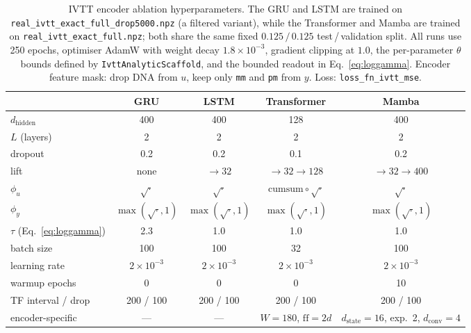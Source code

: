 \begin{table}[h]
\centering
\caption{IVTT encoder ablation hyperparameters. The GRU and LSTM are
trained on \texttt{real\_ivtt\_exact\_full\_drop5000.npz} (a filtered
variant), while the Transformer and Mamba are trained on
\texttt{real\_ivtt\_exact\_full.npz}; both share the same fixed
$0.125\,/\,0.125$ test\,/\,validation split. All runs use 250 epochs,
optimiser AdamW with weight decay $1.8\!\times\!10^{-3}$, gradient clipping
at $1.0$, the per-parameter $\theta$ bounds defined by
\texttt{IvttAnalyticScaffold}, and the bounded readout in
Eq.~\ref{eq:loggamma}. Encoder feature mask: drop DNA from $u$, keep only
\texttt{mm} and \texttt{pm} from $y$. Loss: \texttt{loss\_fn\_ivtt\_mse}.}
\label{tab:ivtt-hparams}
\small
\begin{tabular}{lcccc}
\hline
                        & GRU                  & LSTM                 & Transformer                                 & Mamba \\
\hline
$d_{\mathrm{hidden}}$   & 400                  & 400                  & 128                                         & 400 \\
$L$ (layers)            & 2                    & 2                    & 2                                           & 2 \\
dropout                 & 0.2                  & 0.2                  & 0.1                                         & 0.2 \\
lift                    & none                 & $\to\!32$            & $\to\!32\!\to\!128$                         & $\to\!32\!\to\!400$ \\
$\phi_u$                & $\sqrt{\cdot}$       & $\sqrt{\cdot}$       & $\mathrm{cumsum}\!\circ\!\sqrt{\cdot}$      & $\sqrt{\cdot}$ \\
$\phi_y$                & $\max(\sqrt{\cdot},1)$ & $\max(\sqrt{\cdot},1)$ & $\max(\sqrt{\cdot},1)$                  & $\max(\sqrt{\cdot},1)$ \\
$\tau$ (Eq.~\ref{eq:loggamma}) & 2.3           & 1.0                  & 1.0                                         & 1.0 \\
batch size              & 100                  & 100                  & 32                                          & 100 \\
learning rate           & $2\!\times\!10^{-3}$ & $2\!\times\!10^{-3}$ & $2\!\times\!10^{-3}$                        & $2\!\times\!10^{-3}$ \\
warmup epochs           & 0                    & 0                    & 0                                           & 10 \\
TF interval / drop      & 200 / 100            & 200 / 100            & 200 / 100                                   & 200 / 100 \\
encoder-specific        & ---                  & ---                  & $W\!=\!180$, $\mathrm{ff}\!=\!2d$           & $d_{\mathrm{state}}\!=\!16$, exp.\ 2, $d_{\mathrm{conv}}\!=\!4$ \\
\hline
\end{tabular}
\end{table}

